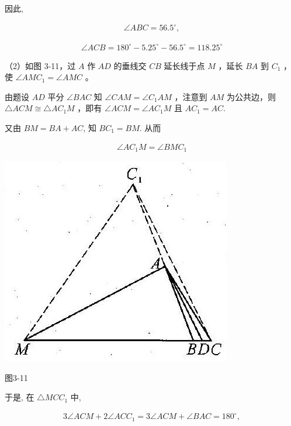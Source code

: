 \documentclass[10pt]{article}
\begin{document}
因此,

\begin{align*}
\angle A B C=56.5^{\circ},
\end{align*}

\begin{align*}
\angle A C B=180^{\circ}-5.25^{\circ}-56.5^{\circ}=118.25^{\circ}
\end{align*}

（2）如图 3-11，过 $A$ 作 $A D$ 的垂线交 $C B$ 延长线于点 $M$ ，延长 $B A$ 到 $C_{1}$ ，使 $\angle A M C_{1}=\angle A M C$ 。

由题设 $A D$ 平分 $\angle B A C$ 知 $\angle C A M=\angle C_{1} A M$ ，注意到 $A M$ 为公共边，则 $\triangle A C M \cong \triangle A C_{1} M$ ，即有 $\angle A C M=\angle A C_{1} M$ 且 $A C_{1}=A C$.

又由 $B M=B A+A C$, 知 $B C_{1}=B M$. 从而

\begin{align*}
\angle A C_{1} M=\angle B M C_{1}
\end{align*}

\begin{center}
\includegraphics[max width=\textwidth]{2024_10_30_2c8f45efd4a519b08e1ag-029}
\end{center}

图3-11

于是, 在 $\triangle M C C_{1}$ 中,

\begin{align*}
3 \angle A C M+2 \angle A C C_{1}=3 \angle A C M+\angle B A C=180^{\circ},
\end{align*}
\end{document}
